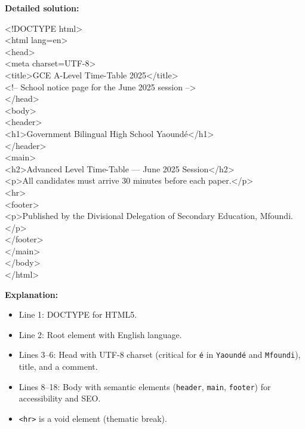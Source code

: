 \documentclass[11pt]{article}
\begin{document}
\begin{exoresolu}
\tcblower
\textbf{Detailed solution:}
\begin{flushleft}\ttfamily\small
\textless{}!DOCTYPE html\textgreater{}\\
\textless{}html lang=\textquotedbl{}en\textquotedbl{}\textgreater{}\\
\textless{}head\textgreater{}\\
\quad \textless{}meta charset=\textquotedbl{}UTF-8\textquotedbl{}\textgreater{}\\
\quad \textless{}title\textgreater{}GCE A-Level Time-Table 2025\textless{}/title\textgreater{}\\
\quad \textless{}!-- School notice page for the June 2025 session --\textgreater{}\\
\textless{}/head\textgreater{}\\
\textless{}body\textgreater{}\\
\quad \textless{}header\textgreater{}\\
\quad\quad \textless{}h1\textgreater{}Government Bilingual High School Yaoundé\textless{}/h1\textgreater{}\\
\quad \textless{}/header\textgreater{}\\
\quad \textless{}main\textgreater{}\\
\quad\quad \textless{}h2\textgreater{}Advanced Level Time-Table --- June 2025 Session\textless{}/h2\textgreater{}\\
\quad\quad \textless{}p\textgreater{}All candidates must arrive 30 minutes before each paper.\textless{}/p\textgreater{}\\
\quad\quad \textless{}hr\textgreater{}\\
\quad\quad \textless{}footer\textgreater{}\\
\quad\quad\quad \textless{}p\textgreater{}Published by the Divisional Delegation of Secondary Education, Mfoundi.\textless{}/p\textgreater{}\\
\quad\quad \textless{}/footer\textgreater{}\\
\quad \textless{}/main\textgreater{}\\
\textless{}/body\textgreater{}\\
\textless{}/html\textgreater{}
\end{flushleft}
\textbf{Explanation:}
\begin{itemize}
\item Line 1: DOCTYPE for HTML5.
\item Line 2: Root element with English language.
\item Lines 3--6: Head with UTF-8 charset (critical for \texttt{é} in \texttt{Yaoundé} and \texttt{Mfoundi}), title, and a comment.
\item Lines 8--18: Body with semantic elements (\texttt{header}, \texttt{main}, \texttt{footer}) for accessibility and SEO.
\item \texttt{<hr>} is a void element (thematic break).
\end{itemize}
\end{exoresolu}
\end{document}
